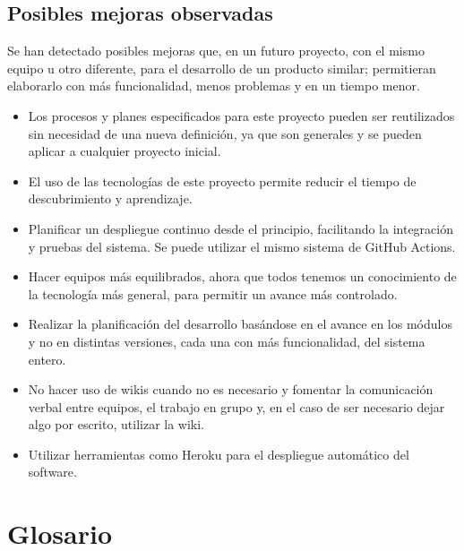 \documentclass{article}
\begin{document}
\subsection*{Posibles mejoras observadas}

Se han detectado posibles mejoras que, en un futuro proyecto, con el mismo equipo u otro diferente, para el desarrollo de un producto similar; permitieran elaborarlo con más funcionalidad, menos problemas y en un tiempo menor.

\begin{itemize}
   \setlength\itemsep{0em}
   \item Los procesos y planes especificados para este proyecto pueden ser reutilizados sin necesidad de una nueva definición, ya que son generales y se pueden aplicar a cualquier proyecto inicial.
   \item El uso de las tecnologías de este proyecto permite reducir el tiempo de descubrimiento y aprendizaje.
   \item Planificar un despliegue continuo desde el principio, facilitando la integración y pruebas del sistema. Se puede utilizar el mismo sistema de GitHub Actions.
   \item Hacer equipos más equilibrados, ahora que todos tenemos un conocimiento de la tecnología más general, para permitir un avance más controlado.
   \item Realizar la planificación del desarrollo basándose en el avance en los módulos y no en distintas versiones, cada una con más funcionalidad, del sistema entero.
   \item No hacer uso de wikis cuando no es necesario y fomentar la comunicación verbal entre equipos, el trabajo en grupo y, en el caso de ser necesario dejar algo por escrito, utilizar la wiki.
   \item Utilizar herramientas como Heroku para el despliegue automático del software.
\end{itemize}

\pagebreak

\section*{Glosario}
\end{document}
